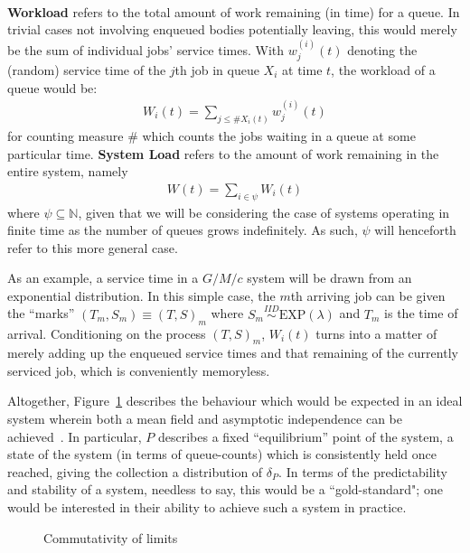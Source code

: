 \begin{definition}
    \hfill \\
    \textbf{Workload} refers to the total amount of work remaining (in time) for a queue.
    In trivial cases not involving enqueued bodies potentially leaving, this would merely be the sum of individual jobs' service times. With $w^{(i)}_{j} (t)$ denoting the (random) service time of the $j$th job in queue $X_{i}$ at time $t$, the workload of a queue would be:
    \begin{align}
        W_{i}(t) = \sum_{j \leq \#X_{i}(t)}w^{(i)}_{j}(t)
    \end{align}
    for counting measure $\#$ which counts the jobs waiting in a queue at some particular time. \textbf{System Load} refers to the amount of work remaining in the entire system, namely
    \begin{align*}
        W(t) = \sum_{i \in \psi}W_{i}(t)
    \end{align*}
    where $\psi \subseteq \mathbb{N}$, given that we will be considering the case of systems operating in finite time as the number of queues grows indefinitely.
    As such, $\psi$ will henceforth refer to this more general case.
\end{definition}
As an example, a service time in a $G/M/c$ system will be drawn from an exponential distribution. In this simple case,
the $m$th arriving job can be given the ``marks'' $(T_{m}, S_{m})\equiv (T, S)_{m}$ where
$S_{m} \overset{IID}\sim \text{EXP}(\lambda)$ and $T_{m}$ is the time of arrival. Conditioning on the process
$(T,S)_{m}$, $W_{i}(t)$ turns into a matter of merely adding up the enqueued service times and that remaining of the
currently serviced job, which is conveniently memoryless.

Altogether, Figure~\ref{fig:1} describes the behaviour which would be expected in an ideal system wherein both a mean field and asymptotic independence can be achieved~\cite{mukhopadhyay_analysis_nodate}. In particular, $P$ describes a fixed ``equilibrium'' point of the system,
a state of the system (in terms of queue-counts) which is consistently held once reached, giving the collection a distribution of $\delta_{P}$.
In terms of the predictability and stability of a system, needless to say, this would be a ``gold-standard";
one would be interested in their ability to achieve such a system in practice.

\begin{figure}
    \centering
    \caption{Commutativity of limits}
    \label{fig:1}
\end{figure}

